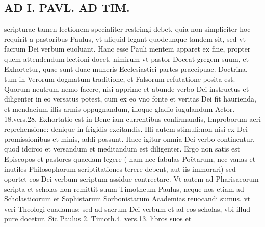 \documentclass{article}
\begin{document}
\begin{pages}
\section*{AD I. PAVL. AD TIM. }
\marginpar{[ p.432 ]}\pstart scripturae tamen lectionem specialiter restringi debet, quia non simpliciter hoc requirit a pastoribus Paulus, vt aliquid legant quodcunque tandem sit, sed vt facrum Dei verbum euoluant. Hanc esse Pauli mentem apparet ex fine, propter quem attendendum lectioni docet, nimirum vt pastor Doceat gregem suum, et Exhortetur, quae sunt duae muneris Ecclesiastici partes praecipuae. Doctrina, tum in Verorum dogmatum traditione, et Falsorum refutatione posita est. Quorum neutrum nemo facere, nisi apprime et abunde verbo Dei instructus et diligenter in eo versatus potest, cum ex eo vno fonte et veritas Dei fit haurienda, et mendacium illis armis oppugnandum, illoque gladio iugulandum Actor. 18.vers.28. Exhortatio est in Bene iam currentibus confirmandis, Improborum acri reprehensione: denique in frigidis excitandis. Illi autem stimuli:non nisi ex Dei promissionibus et minis, addi possunt. Haec igitur omnia Dei verbo continentur, quod idcirco et versandum et meditandum est diligenter. Ergo non satis est Episcopos et pastores quaedam legere ( nam nec fabulas Poëtarum, nec vanas et inutiles Philosophorum scriptitationes terere debent, aut iis immorari) sed oportet eos Dei verbum scriptum assidue contrectare. Vt autem ad Pharisaeorum scripta et scholas non remittit suum Timotheum Paulus, neque nos etiam ad Scholasticorum et Sophistarum Sorbonistarum Academias reuocandi sumus, vt veri Theologi euadamus: sed ad sacrum Dei verbum et ad eos scholas, vbi illud pure docetur. Sic Paulus 2. Timoth.4. vers.13. libros suos et  \pend

\end{pages}
\end{document}
